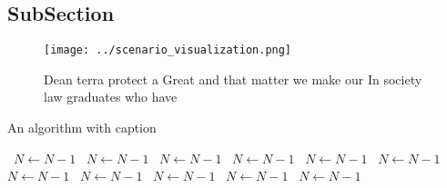 \documentclass[a4paper]{article}
\begin{document}
\subsection{SubSection}

\begin{figure}
\centering
\texttt{[image: ../scenario\_visualization.png]}
\caption{Dean terra protect a Great and that matter we make our In society law graduates who have 
}
\end{figure}
 
\begin{algorithm}
\caption{An algorithm with caption}
\begin{algorithmic}
\    \State $N \gets N - 1$
\    \State $N \gets N - 1$
\    \State $N \gets N - 1$
\    \State $N \gets N - 1$
\    \State $N \gets N - 1$
\    \State $N \gets N - 1$
\    \State $N \gets N - 1$
\    \State $N \gets N - 1$
\    \State $N \gets N - 1$
\    \State $N \gets N - 1$
\    \State $N \gets N - 1$
\EndWhile
\end{algorithmic}
\end{algorithm}
\end{document}
